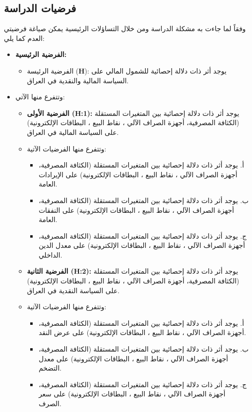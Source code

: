 \documentclass[10pt,a4paper]{report}
\begin{document}
\begin{doublespacing}
\subsection{فرضيات الدراسة}
وفقاً لما جاءت به مشكلة الدراسة ومن خلال التساؤلات الرئيسية يمكن صياغة فرضيتي العدم كما يلي: 
\begin{itemize}
	\item \textbf{الفرضية الرئيسية:} 
	\begin{itemize}
		\item الفرضية الرئيسة (\textbf{H}): يوجد أثر ذات دلالة إحصائية للشمول المالي على السياسة المالية والنقدية في العراق.
	\end{itemize}
	\item وتتفرع منها الآتي: 
	\begin{itemize}
		\item \textbf{الفرضية الأولى (\textbf{H:1}):} يوجد أثر ذات دلالة إحصائية بين المتغيرات المستقلة (الكثافة المصرفية، أجهزة الصراف الآلي ، نقاط البيع ، البطاقات الإلكترونية) على السياسة المالية في العراق.
		\item وتتفرع منها الفرضيات الآتية: 
		\begin{itemize}
			\item أ. يوجد أثر ذات دلالة إحصائية بين المتغيرات المستقلة (الكثافة المصرفية، أجهزة الصراف الآلي ، نقاط البيع ، البطاقات الإلكترونية) على الإيرادات العامة.
			\item ب. يوجد أثر ذات دلالة إحصائية بين المتغيرات المستقلة (الكثافة المصرفية، أجهزة الصراف الآلي ، نقاط البيع ، البطاقات الإلكترونية) على النفقات العامة.
			\item ج. يوجد أثر ذات دلالة إحصائية بين المتغيرات المستقلة (الكثافة المصرفية، أجهزة الصراف الآلي ، نقاط البيع ، البطاقات الإلكترونية) على معدل الدين الداخلي.
		\end{itemize}
		\item \textbf{الفرضية الثانية (\textbf{H:2}):} يوجد أثر ذات دلالة إحصائية بين المتغيرات المستقلة (الكثافة المصرفية، أجهزة الصراف الآلي ، نقاط البيع ، البطاقات الإلكترونية) على السياسة النقدية في العراق.
		\item وتتفرع منها الفرضيات الآتية: 
		\begin{itemize}
			\item أ. يوجد أثر ذات دلالة إحصائية بين المتغيرات المستقلة (الكثافة المصرفية، أجهزة الصراف الآلي ، نقاط البيع ، البطاقات الإلكترونية) على عرض النقد.
			\item ب. يوجد أثر ذات دلالة إحصائية بين المتغيرات المستقلة (الكثافة المصرفية، أجهزة الصراف الآلي ، نقاط البيع ، البطاقات الإلكترونية) على معدل التضخم.
			\item ج. يوجد أثر ذات دلالة إحصائية بين المتغيرات المستقلة (الكثافة المصرفية، أجهزة الصراف الآلي ، نقاط البيع ، البطاقات الإلكترونية) على سعر الصرف.
		\end{itemize}
	\end{itemize}
\end{itemize}

\end{doublespacing}
\end{document}
